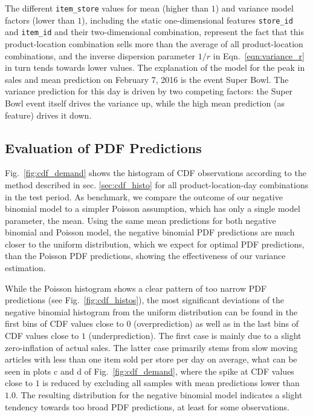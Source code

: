 \documentclass[BCOR=1mm, DIV=calc,10pt,
twoside=true,
twocolumn,
headings=normal]{scrartcl}
\newcommand{\fig}{Fig.~}
\newcommand{\eqn}{Eqn.~}
\begin{document}
\noindent
The different \texttt{item\_store} values for mean (higher than $1$) and variance model factors (lower than $1$), including the static one-dimensional features \texttt{store\_id} and \texttt{item\_id} and their two-dimensional combination, represent the fact that this product-location combination sells more than the average of all product-location combinations, and the inverse dispersion parameter $1/r$ in \eqn \eqref{eqn:variance_r} in turn tends towards lower values. The explanation of the model for the peak in sales and mean prediction on February 7, 2016 is the event Super Bowl. The variance prediction for this day is driven by two competing factors: the Super Bowl event itself drives the variance up, while the high mean prediction (as feature) drives it down.

\subsection{Evaluation of PDF Predictions}

\fig \ref{fig:cdf_demand} shows the histogram of CDF observations according to the method described in sec. \ref{sec:cdf_histo} for all product-location-day combinations in the test period. As benchmark, we compare the outcome of our negative binomial model to a simpler Poisson assumption, which has only a single model parameter, the mean. Using the same mean predictions for both negative binomial and Poisson model, the negative binomial PDF predictions are much closer to the uniform distribution, which we expect for optimal PDF predictions, than the Poisson PDF predictions, showing the effectiveness of our variance estimation.

\noindent
While the Poisson histogram shows a clear pattern of too narrow PDF predictions (see \fig \ref{fig:cdf_histos}), the most significant deviations of the negative binomial histogram from the uniform distribution can be found in the first bins of CDF values close to $0$ (overprediction) as well as in the last bins of CDF values close to $1$ (underprediction). The first case is mainly due to a slight zero-inflation of actual sales. The latter case primarily stems from slow moving articles with less than one item sold per store per day on average, what can be seen in plots c and d of \fig \ref{fig:cdf_demand}, where the spike at CDF values close to $1$ is reduced by excluding all samples with mean predictions lower than $1.0$. The resulting distribution for the negative binomial model indicates a slight tendency towards too broad PDF predictions, at least for some observations.
\end{document}
